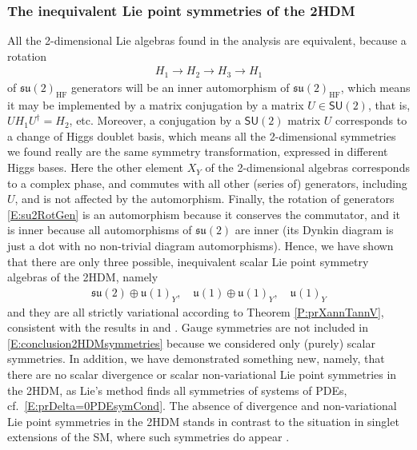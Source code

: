 \documentclass[a4paper,hidelinks, 12pt]{article}
\numberwithin{equation}{section}
\theoremstyle{plain}
\newcommand{\La}{\mathfrak}
\newcommand{\Lg}{\mathsf}
\begin{document}
\subsubsection{The inequivalent Lie point symmetries of the 2HDM}
\label{sec:Conclusion2HDM}
All the 2-dimensional Lie algebras found in the analysis are equivalent, because a rotation 
\begin{align}\label{E:su2RotGen}
	H_1\to H_2 \to H_3 \to H_1 
\end{align}
of $\La{su}(2)_\text{HF}$ generators will be an inner automorphism of $\La{su}(2)_\text{HF}$, which means it may be implemented by a matrix conjugation by a matrix $U\in \Lg{SU}(2)$, that is, $UH_1 U^\dag =H_2$, etc. Moreover, a conjugation by a $\Lg{SU}(2)$ matrix $U$ corresponds to a change of Higgs doublet basis, which means all the 2-dimensional symmetries we found really are the same symmetry transformation, expressed in different Higgs bases.
Here the other element $X_Y$ of the 2-dimensional algebras corresponds to a complex phase, and commutes with all other (series of) generators, including $U$, and is not affected by the automorphism.
 Finally, the rotation of generators \eqref {E:su2RotGen} is an automorphism because it conserves the commutator, and it is inner because all automorphisms of $\La{su}(2)$ are inner (its Dynkin diagram is just a dot with no non-trivial diagram automorphisms).  
Hence, we have shown that there are only three possible, inequivalent scalar Lie point symmetry algebras of the 2HDM, namely
\begin{align}\label{E:conclusion2HDMsymmetries}
	\La{su}(2)\oplus \La{u}(1)_Y, \quad \La{u}(1)\oplus \La{u}(1)_Y,\quad \La{u}(1)_Y
\end{align}
and they are all strictly variational according to Theorem \ref{P:prXannTannV}, consistent with the results in 
\cite{PhysRevD.77.015017} and \cite{Pilaftsis:2011ed}. Gauge symmetries are not included in \eqref{E:conclusion2HDMsymmetries} because we considered only (purely) scalar symmetries. In addition, we have demonstrated something new, namely, that there are no scalar divergence or scalar non-variational Lie point symmetries in the 2HDM, 
as Lie's method finds all symmetries of systems of PDEs,
cf.~\eqref{E:prDelta=0PDEsymCond}. The absence of divergence and non-variational Lie point symmetries in the 2HDM stands in contrast to the situation in singlet extensions of the SM, where such symmetries do appear \cite{singletExtensionsSM}. 
\end{document}

